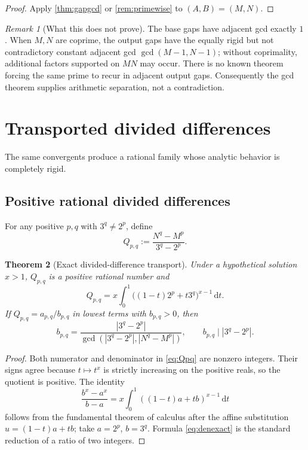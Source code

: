 \documentclass[11pt,oneside]{article}
\newtheorem{theorem}{Theorem}[section]
\theoremstyle{definition}
\theoremstyle{remark}
\newtheorem{remark}[theorem]{Remark}
\newcommand{\abs}[1]{\left|#1\right|}
\newcommand{\dd}{\,\mathrm d}
\begin{document}
\begin{proof}
Apply \cref{thm:gapgcd} or \cref{rem:primewise} to $(A,B)=(M,N)$.
\end{proof}

\begin{remark}[What this does not prove]
The base gaps have adjacent gcd exactly $1$.  When $M,N$ are coprime, the
output gaps have the equally rigid but not contradictory constant adjacent
gcd $\gcd(M-1,N-1)$; without coprimality, additional factors supported on
$MN$ may occur.  There is no known theorem forcing the same prime to recur in adjacent
output gaps.  Consequently the gcd theorem supplies arithmetic separation,
not a contradiction.
\end{remark}

\section{Transported divided differences}
\label{sec:secants}

The same convergents produce a rational family whose analytic behavior is
completely rigid.

\subsection{Positive rational divided differences}

For any positive $p,q$ with $3^q\ne2^p$, define
\begin{equation}
  Q_{p,q}:=\frac{N^q-M^p}{3^q-2^p}.
  \label{eq:Qpq}
\end{equation}

\begin{theorem}[Exact divided-difference transport]
\label{thm:divdiff}
Under a hypothetical solution $x>1$, $Q_{p,q}$ is a positive rational number
and
\begin{equation}
 Q_{p,q}
 =x\int_0^1\bigl((1-t)2^p+t3^q\bigr)^{x-1}\dd t.
 \label{eq:integralQ}
\end{equation}
If $Q_{p,q}=a_{p,q}/b_{p,q}$ in lowest terms with $b_{p,q}>0$, then
\begin{equation}
 b_{p,q}=\frac{\abs{3^q-2^p}}
 {\gcd(\abs{3^q-2^p},\abs{N^q-M^p})},
 \qquad
 b_{p,q}\mid\abs{3^q-2^p}.
 \label{eq:denexact}
\end{equation}
\end{theorem}

\begin{proof}
Both numerator and denominator in \eqref{eq:Qpq} are nonzero integers.  Their
signs agree because $t\mapsto t^x$ is strictly increasing on the positive
reals, so the quotient is positive.  The identity
\[
  \frac{b^x-a^x}{b-a}=x\int_0^1((1-t)a+tb)^{x-1}\dd t
\]
follows from the fundamental theorem of calculus after the affine
substitution $u=(1-t)a+tb$; take $a=2^p$, $b=3^q$.  Formula
\eqref{eq:denexact} is the standard reduction of a ratio of two integers.
\end{proof}
\end{document}
